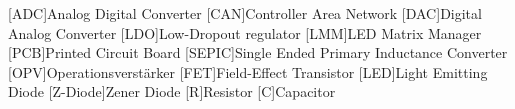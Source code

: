 
\begin{acronym}[ACRONYM]
[ADC]{Analog Digital Converter}
[CAN]{Controller Area Network}
[DAC]{Digital Analog Converter}
[LDO]{Low-Dropout regulator}
[LMM]{LED Matrix Manager}
[PCB]{Printed Circuit Board}
[SEPIC]{Single Ended Primary Inductance Converter}
[OPV]{Operationsverstärker}
[FET]{Field-Effect Transistor}
[LED]{Light Emitting Diode}
[Z-Diode]{Zener Diode}
[R]{Resistor}
[C]{Capacitor}
\end{acronym}\newpage

